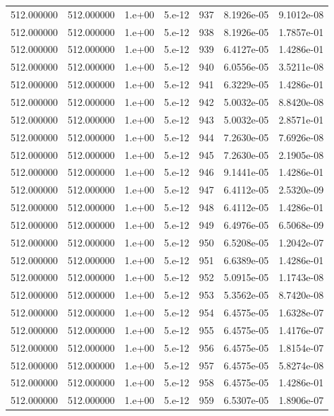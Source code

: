\begin{table}[htbp]
\begin{tabular}{rrrrrrr}
512.000000 & 512.000000 & 1.e+00 & 5.e-12 & 937 & 8.1926e-05 & 9.1012e-08 \\
512.000000 & 512.000000 & 1.e+00 & 5.e-12 & 938 & 8.1926e-05 & 1.7857e-01 \\
512.000000 & 512.000000 & 1.e+00 & 5.e-12 & 939 & 6.4127e-05 & 1.4286e-01 \\
512.000000 & 512.000000 & 1.e+00 & 5.e-12 & 940 & 6.0556e-05 & 3.5211e-08 \\
512.000000 & 512.000000 & 1.e+00 & 5.e-12 & 941 & 6.3229e-05 & 1.4286e-01 \\
512.000000 & 512.000000 & 1.e+00 & 5.e-12 & 942 & 5.0032e-05 & 8.8420e-08 \\
512.000000 & 512.000000 & 1.e+00 & 5.e-12 & 943 & 5.0032e-05 & 2.8571e-01 \\
512.000000 & 512.000000 & 1.e+00 & 5.e-12 & 944 & 7.2630e-05 & 7.6926e-08 \\
512.000000 & 512.000000 & 1.e+00 & 5.e-12 & 945 & 7.2630e-05 & 2.1905e-08 \\
512.000000 & 512.000000 & 1.e+00 & 5.e-12 & 946 & 9.1441e-05 & 1.4286e-01 \\
512.000000 & 512.000000 & 1.e+00 & 5.e-12 & 947 & 6.4112e-05 & 2.5320e-09 \\
512.000000 & 512.000000 & 1.e+00 & 5.e-12 & 948 & 6.4112e-05 & 1.4286e-01 \\
512.000000 & 512.000000 & 1.e+00 & 5.e-12 & 949 & 6.4976e-05 & 6.5068e-09 \\
512.000000 & 512.000000 & 1.e+00 & 5.e-12 & 950 & 6.5208e-05 & 1.2042e-07 \\
512.000000 & 512.000000 & 1.e+00 & 5.e-12 & 951 & 6.6389e-05 & 1.4286e-01 \\
512.000000 & 512.000000 & 1.e+00 & 5.e-12 & 952 & 5.0915e-05 & 1.1743e-08 \\
512.000000 & 512.000000 & 1.e+00 & 5.e-12 & 953 & 5.3562e-05 & 8.7420e-08 \\
512.000000 & 512.000000 & 1.e+00 & 5.e-12 & 954 & 6.4575e-05 & 1.6328e-07 \\
512.000000 & 512.000000 & 1.e+00 & 5.e-12 & 955 & 6.4575e-05 & 1.4176e-07 \\
512.000000 & 512.000000 & 1.e+00 & 5.e-12 & 956 & 6.4575e-05 & 1.8154e-07 \\
512.000000 & 512.000000 & 1.e+00 & 5.e-12 & 957 & 6.4575e-05 & 5.8274e-08 \\
512.000000 & 512.000000 & 1.e+00 & 5.e-12 & 958 & 6.4575e-05 & 1.4286e-01 \\
512.000000 & 512.000000 & 1.e+00 & 5.e-12 & 959 & 6.5307e-05 & 1.8906e-07 \\

\end{tabular}
\end{table}
